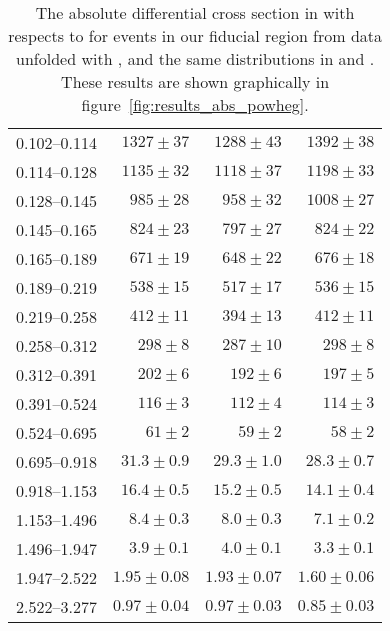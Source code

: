 \begin{table}
\begin{center}
\begin{tabular}{@{}l r r r@{}}
            0.102--0.114  &  $1327  \pm  37$    &  $1288  \pm  43$    &  $1392  \pm  38$    \\
            0.114--0.128  &  $1135  \pm  32$    &  $1118  \pm  37$    &  $1198  \pm  33$    \\
            0.128--0.145  &  $985   \pm  28$    &  $958   \pm  32$    &  $1008  \pm  27$    \\
            0.145--0.165  &  $824   \pm  23$    &  $797   \pm  27$    &  $824   \pm  22$    \\
            0.165--0.189  &  $671   \pm  19$    &  $648   \pm  22$    &  $676   \pm  18$    \\
            0.189--0.219  &  $538   \pm  15$    &  $517   \pm  17$    &  $536   \pm  15$    \\
            0.219--0.258  &  $412   \pm  11$    &  $394   \pm  13$    &  $412   \pm  11$    \\
            0.258--0.312  &  $298   \pm  8$     &  $287   \pm  10$    &  $298   \pm  8$     \\
            0.312--0.391  &  $202   \pm  6$     &  $192   \pm  6$     &  $197   \pm  5$     \\
            0.391--0.524  &  $116   \pm  3$     &  $112   \pm  4$     &  $114   \pm  3$     \\
            0.524--0.695  &  $61    \pm  2$     &  $59    \pm  2$     &  $58    \pm  2$     \\
            0.695--0.918  &  $31.3  \pm  0.9$   &  $29.3  \pm  1.0$   &  $28.3  \pm  0.7$   \\
            0.918--1.153  &  $16.4  \pm  0.5$   &  $15.2  \pm  0.5$   &  $14.1  \pm  0.4$   \\
            1.153--1.496  &  $8.4   \pm  0.3$   &  $8.0   \pm  0.3$   &  $7.1   \pm  0.2$   \\
            1.496--1.947  &  $3.9   \pm  0.1$   &  $4.0   \pm  0.1$   &  $3.3   \pm  0.1$   \\
            1.947--2.522  &  $1.95  \pm  0.08$  &  $1.93  \pm  0.07$  &  $1.60  \pm  0.06$  \\
            2.522--3.277  &  $0.97  \pm  0.04$  &  $0.97  \pm  0.03$  &  $0.85  \pm  0.03$  \\
            \bottomrule
        \end{tabular}
    \end{center}
    \caption[
        The absolute differential cross section in \pb with respects to
        \phistar for \Ztoee events in our fiducial region from data unfolded
        with \POWHEG.
    ]{
        The absolute differential cross section in \pb with respects to
        \phistar for \Ztoee events in our fiducial region from data unfolded
        with \POWHEG, and the same distributions in \MADGRAPH and \POWHEG.
        These results are shown graphically in
        figure~\ref{fig:results_abs_powheg}.
    }
    \label{tab:results_abs_powheg}
\end{table}
